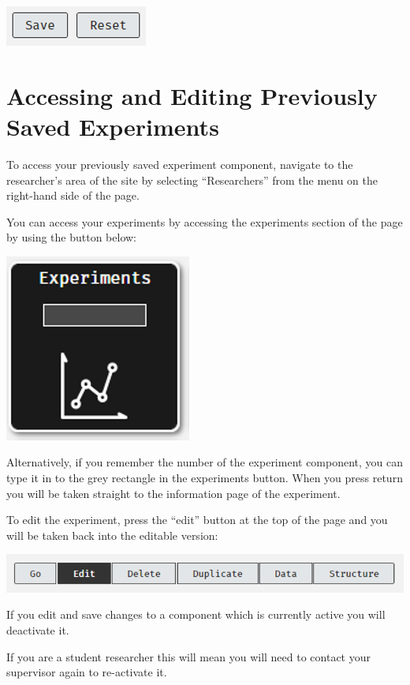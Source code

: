 \documentclass[]{book}
\begin{document}
\includegraphics{images/screenshots/exp_3.png}

\section{Accessing and Editing Previously Saved
Experiments}\label{accessing-and-editing-previously-saved-experiments}

To access your previously saved experiment component, navigate to the
researcher's area of the site by selecting ``Researchers'' from the menu
on the right-hand side of the page.

You can access your experiments by accessing the experiments section of
the page by using the button below:

\includegraphics{images/screenshots/exp_4.png}

Alternatively, if you remember the number of the experiment component,
you can type it in to the grey rectangle in the experiments button. When
you press return you will be taken straight to the information page of
the experiment.

To edit the experiment, press the ``edit'' button at the top of the page
and you will be taken back into the editable version:

\includegraphics{images/screenshots/exp_5.png}

\begin{warning}
If you edit and save changes to a component which is currently active
you will deactivate it.

If you are a student researcher this will mean you will need to contact
your supervisor again to re-activate it.
\end{warning}
\end{document}
